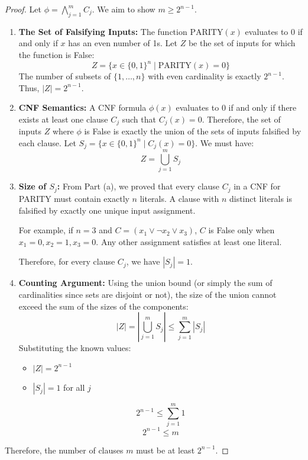 \documentclass[12pt,a4paper]{article}
\theoremstyle{definition}
\begin{document}
\begin{proof}
Let $\phi = \bigwedge_{j=1}^m C_j$. We aim to show $m \ge 2^{n-1}$.

\begin{enumerate}
    \item \textbf{The Set of Falsifying Inputs:}
    The function $\text{PARITY}(x)$ evaluates to 0 if and only if $x$ has an even number of 1s. Let $Z$ be the set of inputs for which the function is False:
    \[ Z = \{ x \in \{0,1\}^n \mid \text{PARITY}(x) = 0 \} \]
    The number of subsets of $\{1, \dots, n\}$ with even cardinality is exactly $2^{n-1}$. Thus, $|Z| = 2^{n-1}$.

    \item \textbf{CNF Semantics:}
    A CNF formula $\phi(x)$ evaluates to 0 if and only if there exists at least one clause $C_j$ such that $C_j(x) = 0$.
    Therefore, the set of inputs $Z$ where $\phi$ is False is exactly the union of the sets of inputs falsified by each clause.
    Let $S_j = \{ x \in \{0,1\}^n \mid C_j(x) = 0 \}$.
    We must have:
    \[ Z = \bigcup_{j=1}^m S_j \]

    \item \textbf{Size of $S_j$:}
    From Part (a), we proved that every clause $C_j$ in a CNF for PARITY must contain exactly $n$ literals.
    A clause with $n$ distinct literals is falsified by exactly one unique input assignment.
    
    For example, if $n=3$ and $C = (x_1 \lor \neg x_2 \lor x_3)$, $C$ is False only when $x_1=0, x_2=1, x_3=0$. Any other assignment satisfies at least one literal.
    
    Therefore, for every clause $C_j$, we have $|S_j| = 1$.

    \item \textbf{Counting Argument:}
    Using the union bound (or simply the sum of cardinalities since sets are disjoint or not), the size of the union cannot exceed the sum of the sizes of the components:
    \[ |Z| = \left| \bigcup_{j=1}^m S_j \right| \le \sum_{j=1}^m |S_j| \]
    Substituting the known values:
    \begin{itemize}
        \item $|Z| = 2^{n-1}$
        \item $|S_j| = 1$ for all $j$
    \end{itemize}
    \[ 2^{n-1} \le \sum_{j=1}^m 1 \]
    \[ 2^{n-1} \le m \]
\end{enumerate}

Therefore, the number of clauses $m$ must be at least $2^{n-1}$.
\end{proof}
\end{document}
